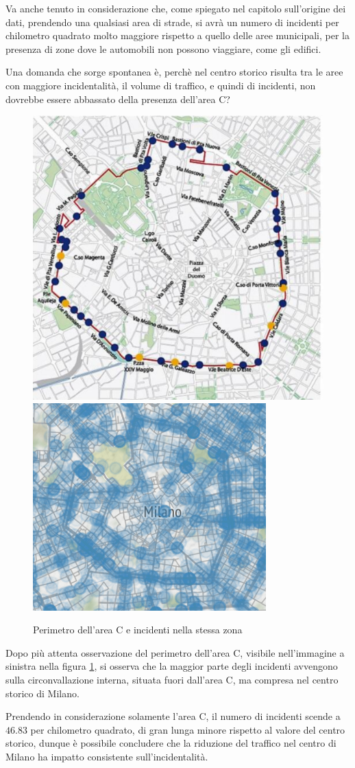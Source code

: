\documentclass[a4paper,12pt]{report}
\begin{document}
Va anche tenuto in considerazione che, come spiegato nel capitolo sull'origine dei dati, 
prendendo una qualsiasi area di strade, si avrà un numero di incidenti per chilometro quadrato 
molto maggiore rispetto a quello delle aree municipali, per la presenza di zone dove  
le automobili non possono viaggiare, come gli edifici.

Una domanda che sorge spontanea è, perchè nel centro storico risulta tra le aree con maggiore 
incidentalità, il volume di traffico, e quindi di incidenti, non dovrebbe essere abbassato 
della presenza dell'area C?

\begin{figure}
    \includegraphics[width=0.48\linewidth]{img/perimetro_area_c.png}
    \includegraphics[width=0.52\linewidth]{../src/area_c/area_c_incidenti.png}
    \caption{Perimetro dell'area C e incidenti nella stessa zona}
    \label{fig:perimetro-area-c}
\end{figure}

Dopo più attenta osservazione del perimetro dell'area C, visibile nell'immagine a sinistra nella 
figura \ref{fig:perimetro-area-c}, si osserva che la maggior parte degli 
incidenti avvengono sulla circonvallazione interna, 
situata fuori dall'area C, ma compresa nel centro storico di Milano.

Prendendo in considerazione solamente l'area C, il numero di incidenti scende a $46.83$ 
per chilometro quadrato, di gran lunga minore rispetto al valore del centro storico, 
dunque è possibile concludere che la riduzione del traffico nel centro di Milano ha impatto 
consistente sull'incidentalità.
\end{document}
